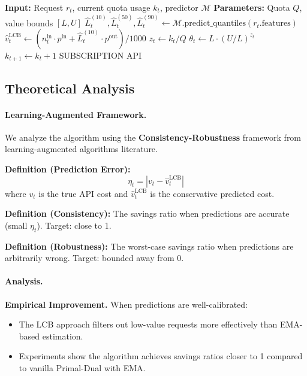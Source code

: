 \documentclass[11pt]{article}
\begin{document}
\begin{algorithm}[H]
\caption{Learning-Augmented Primal-Dual Routing}
\begin{algorithmic}[1]
\STATE \textbf{Input:} Request $r_t$, current quota usage $k_t$, predictor $\mathcal{M}$
\STATE \textbf{Parameters:} Quota $Q$, value bounds $[L, U]$
\STATE
\STATE {}
\STATE $\hat{L}^{(10)}_t, \hat{L}^{(50)}_t, \hat{L}^{(90)}_t \gets \mathcal{M}.\text{predict\_quantiles}(r_t.\text{features})$
\STATE
\STATE {}
\STATE $\hat{v}^{\text{LCB}}_t \gets (n^{\text{in}}_t \cdot p^{\text{in}} + \hat{L}^{(10)}_t \cdot p^{\text{out}}) / 1000$
\STATE
\STATE {}
\STATE $z_t \gets k_t / Q$
\STATE $\theta_t \gets L \cdot (U/L)^{z_t}$
\STATE
\STATE {}
    \STATE $k_{t+1} \gets k_t + 1$
    \RETURN SUBSCRIPTION
\ELSE
    \RETURN API
\ENDIF
\end{algorithmic}
\end{algorithm}

\subsection{Theoretical Analysis}

\paragraph{Learning-Augmented Framework.}
We analyze the algorithm using the \textbf{Consistency-Robustness} framework from learning-augmented algorithms literature.

\textbf{Definition (Prediction Error):}
\[ \eta_t = |v_t - \hat{v}^{\text{LCB}}_t| \]
where $v_t$ is the true API cost and $\hat{v}^{\text{LCB}}_t$ is the conservative predicted cost.

\textbf{Definition (Consistency):} The savings ratio when predictions are accurate (small $\eta_t$). Target: close to 1.

\textbf{Definition (Robustness):} The worst-case savings ratio when predictions are arbitrarily wrong. Target: bounded away from 0.

\paragraph{Analysis.}

\textbf{Empirical Improvement.} When predictions are well-calibrated:
\begin{itemize}
  \item The LCB approach filters out low-value requests more effectively than EMA-based estimation.
  \item Experiments show the algorithm achieves savings ratios closer to 1 compared to vanilla Primal-Dual with EMA.
\end{itemize}
\end{document}
